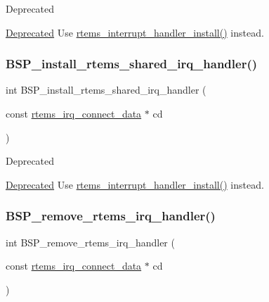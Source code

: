 \begin{DoxyRefDesc}{Deprecated}
\item[\mbox{\hyperlink{deprecated__deprecated000002}{Deprecated}}]Use \mbox{\hyperlink{group__rtems__interrupt__extension_ga086cc450fcdc9e37bfd0744a763dbfd4}{rtems\+\_\+interrupt\+\_\+handler\+\_\+install()}} instead. \end{DoxyRefDesc}
\mbox{\label{irq-legacy_8c_acab7c86c6044f62f97cf47be2599c121}} 
\subsubsection{\texorpdfstring{BSP\_install\_rtems\_shared\_irq\_handler()}{BSP\_install\_rtems\_shared\_irq\_handler()}}
{\footnotesize\ttfamily int B\+S\+P\+\_\+install\+\_\+rtems\+\_\+shared\+\_\+irq\+\_\+handler (\begin{DoxyParamCaption}\item[{const \mbox{\hyperlink{struct____rtems__irq__connect__data____}{rtems\+\_\+irq\+\_\+connect\+\_\+data}} $\ast$}]{cd }\end{DoxyParamCaption})}

\begin{DoxyRefDesc}{Deprecated}
\item[\mbox{\hyperlink{deprecated__deprecated000003}{Deprecated}}]Use \mbox{\hyperlink{group__rtems__interrupt__extension_ga086cc450fcdc9e37bfd0744a763dbfd4}{rtems\+\_\+interrupt\+\_\+handler\+\_\+install()}} instead. \end{DoxyRefDesc}
\mbox{\label{irq-legacy_8c_ad2275e290ae086c1b8a78168da08f0ee}} 
\subsubsection{\texorpdfstring{BSP\_remove\_rtems\_irq\_handler()}{BSP\_remove\_rtems\_irq\_handler()}}
{\footnotesize\ttfamily int B\+S\+P\+\_\+remove\+\_\+rtems\+\_\+irq\+\_\+handler (\begin{DoxyParamCaption}\item[{const \mbox{\hyperlink{struct____rtems__irq__connect__data____}{rtems\+\_\+irq\+\_\+connect\+\_\+data}} $\ast$}]{cd }\end{DoxyParamCaption})}

